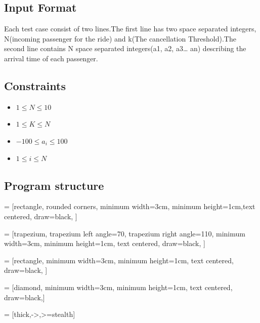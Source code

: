 \documentclass[a4paper,12pt]{article}
\begin{document}
\subsection{Input Format}
Each test case consist of two lines.The first line has two space separated integers, N(incoming passenger for the ride) and k(The cancellation Threshold).The second line contains N space separated integers(a1, a2, a3… an) describing the arrival time of each passenger.\\
\subsection*{Constraints}
\begin{itemize}
\item $1 \leqslant N \leqslant 10$
\item $1 \leqslant K \leqslant N$
\item $-100 \leqslant a_i \leqslant 100$
\item $1 \leqslant i \leqslant N$
\end{itemize}
\subsection{Program structure}


 = [rectangle, rounded corners, minimum width=3cm, minimum height=1cm,text centered, draw=black, ]

 = [trapezium, trapezium left angle=70, trapezium right angle=110, minimum width=3cm, minimum height=1cm, text centered, draw=black, ]

 = [rectangle, minimum width=3cm, minimum height=1cm, text centered, draw=black, ]

 = [diamond, minimum width=3cm, minimum height=1cm, text centered, draw=black,]


 = [thick,->,>=stealth]



\end{document}
